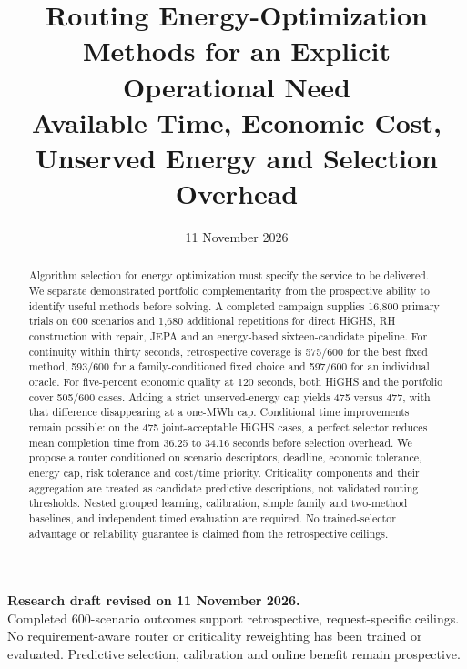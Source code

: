 
\renewcommand{\draftstatus}{\begin{center}\small
  \textbf{Research draft revised on 11 November 2026.}\\
  Completed 600-scenario outcomes support retrospective, request-specific ceilings.
  No requirement-aware router or criticality reweighting has been trained or evaluated.
  Predictive selection, calibration and online benefit remain prospective.
\end{center}}
\date{11 November 2026}

\title{Routing Energy-Optimization Methods for an Explicit Operational Need\\
Available Time, Economic Cost, Unserved Energy and Selection Overhead}

\maketitle
\draftstatus
\begin{abstract}
Algorithm selection for energy optimization must specify the service to be
delivered. We separate demonstrated portfolio complementarity from the
prospective ability to identify useful methods before solving. A completed
campaign supplies 16,800 primary trials on 600 scenarios and 1,680 additional
repetitions for direct HiGHS, RH construction with repair, JEPA and an
energy-based sixteen-candidate pipeline. For continuity within thirty
seconds, retrospective coverage is 575/600 for the best fixed method,
593/600 for a family-conditioned fixed choice and 597/600 for an individual
oracle. For five-percent economic quality at 120 seconds, both HiGHS and the
portfolio cover 505/600 cases. Adding a strict unserved-energy cap yields
475 versus 477, with that difference disappearing at a one-MWh cap.
Conditional time improvements remain possible: on the 475 joint-acceptable
HiGHS cases, a perfect selector reduces mean completion time from 36.25 to
34.16 seconds before selection overhead. We propose a router conditioned on
scenario descriptors, deadline, economic tolerance, energy cap, risk tolerance
and cost/time priority. Criticality components and their aggregation are
treated as candidate predictive descriptions, not validated routing thresholds.
Nested grouped learning, calibration, simple family and two-method baselines,
and independent timed evaluation are required. No trained-selector advantage
or reliability guarantee is claimed from the retrospective ceilings.

\end{abstract}

